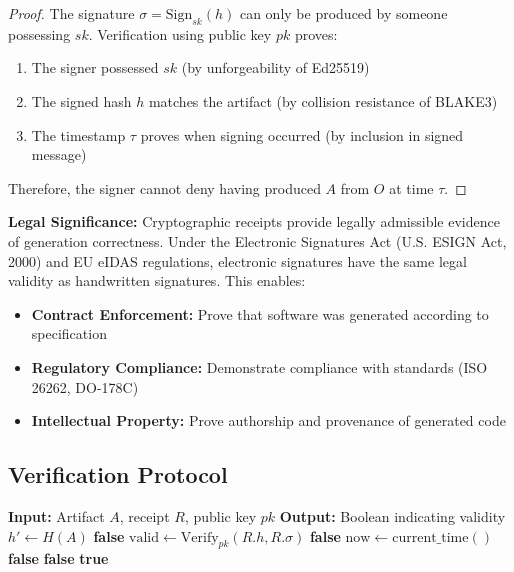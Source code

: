\begin{proof}
    The signature \(\sigma = \text{Sign}_{sk}(h)\) can only be produced by someone possessing \(sk\). Verification using public key \(pk\) proves:
    \begin{enumerate}
        \item The signer possessed \(sk\) (by unforgeability of Ed25519)
        \item The signed hash \(h\) matches the artifact (by collision resistance of BLAKE3)
        \item The timestamp \(\tau\) proves when signing occurred (by inclusion in signed message)
    \end{enumerate}
    Therefore, the signer cannot deny having produced \(A\) from \(O\) at time \(\tau\).
\end{proof}

\textbf{Legal Significance:} Cryptographic receipts provide legally admissible evidence of generation correctness. Under the Electronic Signatures Act (U.S. ESIGN Act, 2000) and EU eIDAS regulations, electronic signatures have the same legal validity as handwritten signatures. This enables:

\begin{itemize}
    \item \textbf{Contract Enforcement:} Prove that software was generated according to specification
    \item \textbf{Regulatory Compliance:} Demonstrate compliance with standards (ISO 26262, DO-178C)
    \item \textbf{Intellectual Property:} Prove authorship and provenance of generated code
\end{itemize}

\subsection{Verification Protocol}

\begin{algorithm}
\caption{Receipt Verification}
\begin{algorithmic}[1]
    \State \textbf{Input:} Artifact \(A\), receipt \(R\), public key \(pk\)
    \State \textbf{Output:} Boolean indicating validity
    \State
    \State {}
    \State \(h' \leftarrow H(A)\)
     \Return \textbf{false} \EndIf
    \State
    \State {}
    \State \(\text{valid} \leftarrow \text{Verify}_{pk}(R.h, R.\sigma)\)
     \Return \textbf{false} \EndIf
    \State
    \State {}
    \State \(\text{now} \leftarrow \text{current\_time}()\)
     \Return \textbf{false} \EndIf
    \State
    \State {}
     \Return \textbf{false} \EndIf
    \State
    \State \Return \textbf{true}
\end{algorithmic}
\end{algorithm}

